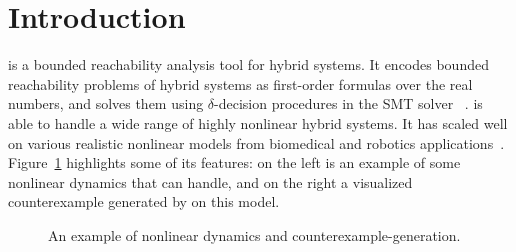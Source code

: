 \section{Introduction}\label{sec:intro}


\dReach{} is a bounded reachability analysis tool for hybrid systems. It encodes
bounded reachability problems of hybrid systems as first-order
formulas over the real numbers, and solves them using
$\delta$-decision procedures in the SMT solver \dReal{}~\cite{}. \dReach{} is
able to handle a wide range of highly nonlinear hybrid systems. It has
scaled well on various realistic nonlinear models from biomedical and
robotics applications~\cite{}. Figure~\ref{fig:prostate-example} highlights 
some of its features: 
on the left is an example of some nonlinear dynamics that \dReach{} can handle, 
and on the right a visualized counterexample generated by \dReach{} on this model.
\begin{figure}[!h]
  \hfill
  \caption{An example of nonlinear dynamics and counterexample-generation.}
  \label{fig:prostate-example}
\end{figure}

